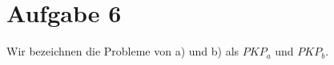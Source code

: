 \documentclass[a4paper,11pt]{scrartcl}
\begin{document}
\section*{Aufgabe 6}
	Wir bezeichnen die Probleme von a) und b) als $PKP_a$ und $PKP_b$.
	
\end{document}
